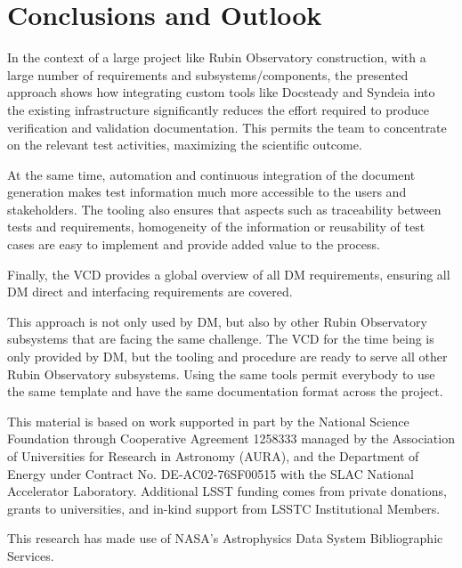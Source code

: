 \section{Conclusions and Outlook}
\label{sec:conclusions}

In the context of a large project like Rubin Observatory construction, with a large number of requirements
and subsystems/components, the presented approach shows how integrating custom tools like Docsteady
and Syndeia into the existing infrastructure significantly reduces the effort
required to produce verification and validation documentation.
This permits the team to concentrate on the relevant test activities, maximizing the scientific outcome.

At the same time, automation and continuous integration of the document generation makes test information
much more accessible to the users and stakeholders.
The tooling also ensures that aspects such as traceability between tests and requirements, homogeneity of the information
or reusability of test cases are easy to implement and provide added value to the process.

Finally, the VCD provides a global overview of all DM requirements, ensuring all DM direct and interfacing requirements are covered.

This approach is not only used by DM, but also by other Rubin Observatory subsystems that are facing the same challenge.
The VCD for the time being is only provided by DM, but the tooling and procedure are ready to serve all other Rubin Observatory subsystems.
Using the same tools permit everybody to use the same template and have the same documentation format across the project.


\acknowledgments
This material is based on work supported in part by the  {National Science Foundation} through Cooperative Agreement 1258333 managed by the  {Association of Universities for Research in Astronomy} ({AURA}), and the  {Department of Energy} under  {Contract} No.  {DE}-AC02-76SF00515 with the  {SLAC} National Accelerator Laboratory. Additional LSST funding comes from private donations, grants to universities, and in-kind support from LSSTC Institutional Members.

This research has made use of  NASA's Astrophysics Data System Bibliographic Services.
